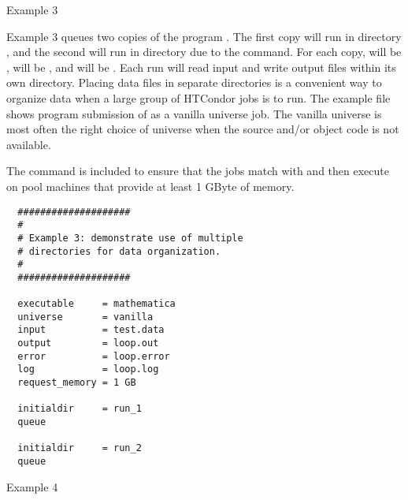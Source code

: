 \begin{description}
\item[Example 3]
\end{description}

Example 3 queues two copies of the program . The
first copy will run in directory , and the second will run in
directory  due to the  command.
For each copy, 
 will be ,
 will be , and
 will be .
Each run will read input and write output files within its own directory.
Placing data files in separate directories 
is a convenient way to organize data when
a large group of HTCondor jobs is to run.
The example file shows program submission of
 as a vanilla universe job.
The vanilla universe is most often the right choice of universe
when the source and/or object code is not available.

The  command is included to ensure
that the  jobs match with and then execute on
pool machines that provide at least 1 GByte of memory.

\begin{verbatim}
  ####################     
  #                       
  # Example 3: demonstrate use of multiple     
  # directories for data organization.      
  #                                        
  ####################                    
                                         
  executable     = mathematica          
  universe       = vanilla                   
  input          = test.data                
  output         = loop.out                
  error          = loop.error             
  log            = loop.log                                                    
  request_memory = 1 GB
                                  
  initialdir     = run_1         
  queue                         
                               
  initialdir     = run_2      
  queue                     
\end{verbatim}

\begin{description}
\item[Example 4]
\end{description}

